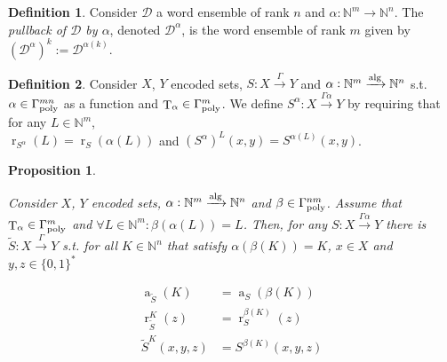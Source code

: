 \documentclass[11pt]{article}
\numberwithin{equation}{section}
\theoremstyle{definition}
\newtheorem{definition}{Definition}[section]
\theoremstyle{plain}
\newtheorem{proposition}{Proposition}[section]
\newcommand{\Bool}{\{0,1\}}
\newcommand{\Words}{{\Bool^*}}
\DeclareMathOperator{\T}{T}
\DeclareMathOperator{\R}{r}
\DeclareMathOperator{\A}{a}
\newcommand{\Nats}{\mathbb{N}}
\newcommand{\Dist}{\mathcal{D}}
\newcommand{\GammaPoly}{\Gamma_{\textnormal{poly}}}
\newcommand{\Alg}{\xrightarrow{\textnormal{alg}}}
\newcommand{\Scheme}{\xrightarrow{\Gamma}}
\begin{document}
\begin{samepage}
\begin{definition}

Consider ${\Dist}$ a word ensemble of rank ${n}$ and ${\alpha: \Nats^m \rightarrow \Nats^n}$. The \emph{pullback of ${\Dist}$ by ${\alpha}$}, denoted ${\Dist^\alpha}$, is the word ensemble of rank ${m}$ given by ${(\Dist^\alpha)^k:=\Dist^{\alpha(k)}}$.

\end{definition}
\end{samepage}

\begin{samepage}
\begin{definition}

Consider ${X}$, ${Y}$ encoded sets, ${S: X \Scheme Y}$ and ${\alpha: \Nats^m \Alg \Nats^n}$ s.t. ${\alpha \in \GammaPoly^{mn}}$ as a function and ${\T_\alpha \in \GammaPoly^m}$. We define ${S^\alpha: X \xrightarrow{\Gamma \alpha} Y}$ by requiring that for any ${L \in \Nats^m}$,\\ $\R_{S^\alpha}(L)=\R_S(\alpha(L))$ and ${(S^\alpha)^L(x,y)=S^{\alpha(L)}(x,y)}$.

\end{definition}
\end{samepage}

\begin{samepage}
\begin{proposition}
\label{prp:rev_sch_idx}

Consider  ${X}$, ${Y}$ encoded sets, ${\alpha: \Nats^m \Alg \Nats^n}$ and ${\beta \in \GammaPoly^{nm}}$. Assume that\\ $\T_\alpha \in \GammaPoly^m$ and ${\forall L \in \Nats^m: \beta(\alpha(L))=L}$. Then, for any  ${S: X \xrightarrow{\Gamma \alpha} Y}$ there is ${\tilde{S}: X \Scheme Y}$ s.t. for all ${K \in \Nats^n}$ that satisfy ${\alpha(\beta(K))=K}$, ${x \in X}$ and ${y,z \in \Words}$

\begin{align}
\A_{\tilde{S}}(K)&=\A_S(\beta(K)) \\
\R_{\tilde{S}}^K(z)&=\R_S^{\beta(K)}(z) \\
\tilde{S}^K(x,y,z)&=S^{\beta(K)}(x,y,z)
\end{align}

\end{proposition}
\end{samepage}
\end{document}
